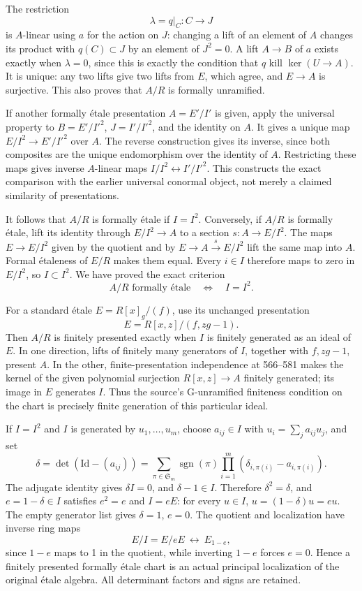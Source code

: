 The restriction \[
\lambda=q|_C:C\longrightarrow J
\] is \(A\)-linear using \(a\) for the action on \(J\): changing a lift of an element of \(A\) changes its product with \(q(C)\subset J\) by an element of \(J^2=0\). A lift \(A\to B\) of \(a\) exists exactly when \(\lambda=0\), since this is exactly the condition that \(q\) kill \(\ker(U\to A)\). It is unique: any two lifts give two lifts from \(E\), which agree, and \(E\to A\) is surjective. This also proves that \(A/R\) is formally unramified.

If another formally étale presentation \(A=E'/I'\) is given, apply the universal property to \(B=E'/I'^2\), \(J=I'/I'^2\), and the identity on \(A\). It gives a unique map \(E/I^2\to E'/I'^2\) over \(A\). The reverse construction gives its inverse, since both composites are the unique endomorphism over the identity of \(A\). Restricting these maps gives inverse \(A\)-linear maps \(I/I^2\leftrightarrow I'/I'^2\). This constructs the exact comparison with the earlier universal conormal object, not merely a claimed similarity of presentations.

It follows that \(A/R\) is formally étale if \(I=I^2\). Conversely, if \(A/R\) is formally étale, lift its identity through \(E/I^2\to A\) to a section \(s:A\to E/I^2\). The maps \(E\to E/I^2\) given by the quotient and by \(E\to A\xrightarrow s E/I^2\) lift the same map into \(A\). Formal étaleness of \(E/R\) makes them equal. Every \(i\in I\) therefore maps to zero in \(E/I^2\), so \(I\subset I^2\). We have proved the exact criterion \[
A/R\text{ formally étale}\quad\Longleftrightarrow\quad I=I^2.
\]

For a standard étale \(E=R[x]_g/(f)\), use its unchanged presentation \[
E=R[x,z]/(f,zg-1).
\] Then \(A/R\) is finitely presented exactly when \(I\) is finitely generated as an ideal of \(E\). In one direction, lifts of finitely many generators of \(I\), together with \(f,zg-1\), present \(A\). In the other, finite-presentation independence at 566--581 makes the kernel of the given polynomial surjection \(R[x,z]\to A\) finitely generated; its image in \(E\) generates \(I\). Thus the source's G-unramified finiteness condition on the chart is precisely finite generation of this particular ideal.

If \(I=I^2\) and \(I\) is generated by \(u_1,\ldots,u_m\), choose \(a_{ij}\in I\) with \(u_i=\sum_j a_{ij}u_j\), and set \[
\delta=\det(\mathrm{Id}-(a_{ij}))
 =\sum_{\pi\in\mathfrak S_m}\operatorname{sgn}(\pi)
       \prod_{i=1}^m(\delta_{i,\pi(i)}-a_{i,\pi(i)}).
\] The adjugate identity gives \(\delta I=0\), and \(\delta-1\in I\). Therefore \(\delta^2=\delta\), and \(e=1-\delta\in I\) satisfies \(e^2=e\) and \(I=eE\): for every \(u\in I\), \(u=(1-\delta)u=eu\). The empty generator list gives \(\delta=1\), \(e=0\). The quotient and localization have inverse ring maps \[
E/I=E/eE\ \longleftrightarrow\ E_{1-e},
\] since \(1-e\) maps to 1 in the quotient, while inverting \(1-e\) forces \(e=0\). Hence a finitely presented formally étale chart is an actual principal localization of the original étale algebra. All determinant factors and signs are retained.


